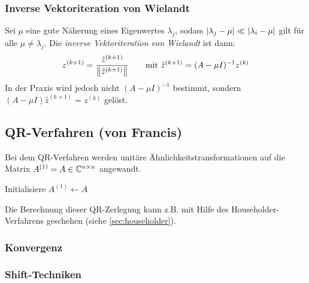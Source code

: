 			\subsubsection{Inverse Vektoriteration von Wielandt}
				Sei \( \mu \) eine gute Näherung eines Eigenwertes \( \lambda_j \), sodass \( \abs{\lambda_j - \mu} \ll \abs{\lambda_i - \mu} \) gilt für alle \( \mu \neq \lambda_j \). Die \textit{inverse Vektoriteration von Wielandt} ist dann:
				\begin{equation*}
					z^{(k+1)} = \frac{\hat{z}^{(k+1)}}{\norm{\hat{z}^{(k+1)}}} \qquad \textrm{mit } \hat{z}^{(k+1)} = (A - \mu I)^{-1} z^{(k)}
				\end{equation*}
				In der Praxis wird jedoch nicht \( (A - \mu I)^{-1} \) bestimmt, sondern \( (A - \mu I) \hat{z}^{(k+1)} = z^{(k)} \) gelöst.


		\subsection{QR-Verfahren (von Francis)}
			Bei dem QR-Verfahren werden unitäre Ähnlichkeitstransformationen auf die Matrix \( A^{(1)} = A \in \mathbb{C}^{n \times n} \) angewandt.

			\begin{algorithm}[H]
				Initialisiere \( A^{(1)} \gets A \)

			\end{algorithm}

			Die Berechnung dieser QR-Zerlegung kann z.B. mit Hilfe des Householder-Verfahrens geschehen (siehe \ref{sec:householder}).

			\subsubsection{Konvergenz}

			\subsubsection{Shift-Techniken}

